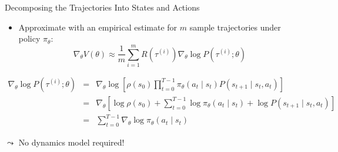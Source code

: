 \documentclass[aspectratio=169]{../latex_main/tntbeamer}  %
\begin{document}
\begin{frame}[c]{Decomposing the Trajectories Into States and Actions}
	
	\begin{itemize}
		\item Approximate with an empirical estimate for $m$ sample trajectories under
		policy $\pi_\theta$:
		$$\nabla_\theta V(\theta) \approx \frac{1}{m} \sum_{i=1}^{m} R(\tau^{(i)}) \nabla_\theta \log P(\tau^{(i)}; \theta) $$
	\end{itemize}

{\footnotesize
\begin{eqnarray*}
\nabla_\theta \log P(\tau^{(i)}; \theta) &=& \nabla_\theta \log \left[ \rho(s_0) \prod_{t=0}^{T-1} \pi_\theta(a_t \mid s_t) P(s_{t+1} \mid s_t, a_t) \right]\\
&=& \nabla_\theta \left[ \log \rho(s_0) + \sum_{t=0}^{T-1} \log \pi_\theta(a_t \mid s_t) + \log P(s_{t+1}\mid s_t, a_t) \right]\\
&=& \sum_{t=0}^{T-1} \nabla_\theta \log \pi_\theta (a_t \mid s_t)
\end{eqnarray*}}
	
$\leadsto$ \alert{No dynamics model required!}
	
\end{frame}
\end{document}
